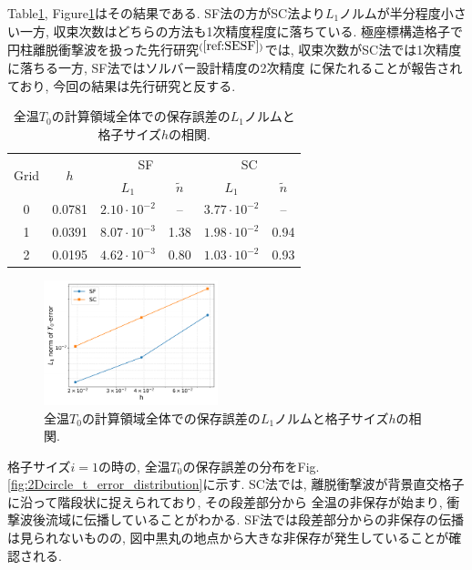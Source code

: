 \documentclass[a4j]{jarticle}
\begin{document}
Table\ref{tab:2D_circle_global_error}, Figure\ref{fig:2Dcircle_t_error}はその結果である.
SF法の方がSC法より$L_1$ノルムが半分程度小さい一方, 収束次数はどちらの方法も1次精度程度に落ちている.
極座標構造格子で円柱離脱衝撃波を扱った先行研究$^{(\ref{ref:SESF})}$では, 収束次数がSC法では1次精度に落ちる一方, SF法ではソルバー設計精度の2次精度
に保たれることが報告されており, 今回の結果は先行研究と反する.
\begin{table}[h]
  \centering
  \caption{全温$T_0$の計算領域全体での保存誤差の$L_1$ノルムと格子サイズ$h$の相関.}
  \begin{tabular}{cccccc}
    \toprule
    \multirow{2}{*}{Grid} & \multirow{2}{*}{$h$}
    & \multicolumn{2}{c}{SF} & \multicolumn{2}{c}{SC} \\
    \cmidrule(lr){3-4} \cmidrule(lr){5-6}
    & & $L_1$ & $\tilde{n}$ & $L_1$ & $\tilde{n}$ \\
    \midrule
    0 & 0.0781 & $2.10 \cdot 10^{-2}$ & –    & $3.77 \cdot 10^{-2}$ & – \\
    1 & 0.0391 & $8.07 \cdot 10^{-3}$ & 1.38 & $1.98 \cdot 10^{-2}$ & 0.94 \\
    2 & 0.0195 & $4.62 \cdot 10^{-3}$ & 0.80 & $1.03 \cdot 10^{-2}$ & 0.93 \\
    \bottomrule
  \end{tabular} 
  \label{tab:2D_circle_global_error}
\end{table}

\begin{figure}[h]
    \begin{center}
        \includegraphics[width=0.45\textwidth]{2Dcircle_t_error.pdf}
    \end{center}
    \caption{全温$T_0$の計算領域全体での保存誤差の$L_1$ノルムと格子サイズ$h$の相関.}
    \label{fig:2Dcircle_t_error}
\end{figure}

格子サイズ$i=1$の時の, 全温$T_0$の保存誤差の分布をFig.\ref{fig:2Dcircle_t_error_distribution}に示す. 
SC法では, 離脱衝撃波が背景直交格子に沿って階段状に捉えられており, その段差部分から
全温の非保存が始まり, 衝撃波後流域に伝播していることがわかる.
SF法では段差部分からの非保存の伝播は見られないものの, 図中黒丸の地点から大きな非保存が発生していることが確認される.
\end{document}
